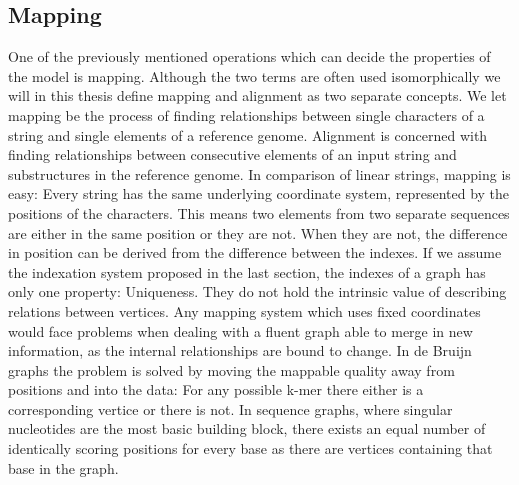 \documentclass[thesis.tex]{subfiles}
\begin{document}
\subsection{Mapping}
\label{sec:mapping}
One of the previously mentioned operations which can decide the properties of the model is mapping. Although the two terms are often used isomorphically we will in this thesis define mapping and alignment as two separate concepts. We let mapping be the process of finding relationships between single characters of a string and single elements of a reference genome. Alignment is concerned with finding relationships between consecutive elements of an input string and substructures in the reference genome. In comparison of linear strings, mapping is easy: Every string has the same underlying coordinate system, represented by the positions of the characters. This means two elements from two separate sequences are either in the same position or they are not. When they are not, the difference in position can be derived from the difference between the indexes. If we assume the indexation system proposed in the last section, the indexes of a graph has only one property: Uniqueness. They do not hold the intrinsic value of describing relations between vertices. Any mapping system which uses fixed coordinates would face problems when dealing with a fluent graph able to merge in new information, as the internal relationships are bound to change. In de Bruijn graphs the problem is solved by moving the mappable quality away from positions and into the data: For any possible k-mer there either is a corresponding vertice or there is not. In sequence graphs, where singular nucleotides are the most basic building block, there exists an equal number of identically scoring positions for every base as there are vertices containing that base in the graph.\\
\par\noindent
\end{document}
